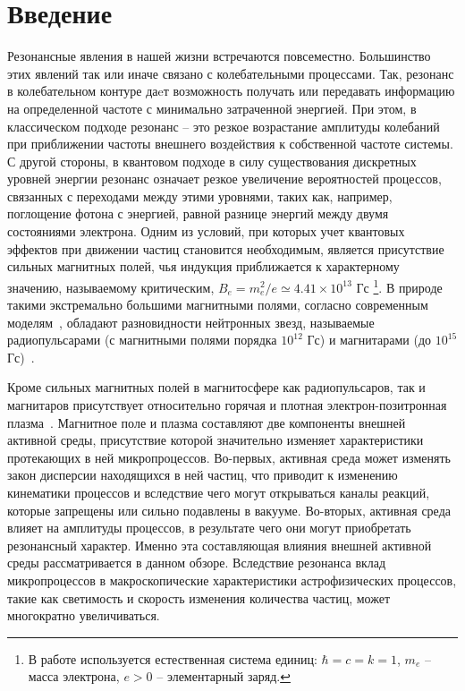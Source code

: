 \section{Введение}
Резонансные явления в нашей жизни встречаются повсеместно. Большинство этих явлений так или иначе связано с колебательными процессами. Так, резонанс в колебательном контуре даeт возможность получать или передавать информацию 
на определенной частоте с минимально затраченной энергией. При этом, в классическом подходе резонанс -- это резкое возрастание амплитуды колебаний при приближении частоты внешнего воздействия к собственной частоте системы. С другой стороны, в квантовом подходе в силу существования дискретных уровней энергии резонанс означает резкое увеличение вероятностей процессов, связанных с переходами между этими уровнями, таких как, например, поглощение фотона с энергией, равной разнице энергий между двумя состояниями электрона. Одним из условий, при которых учет квантовых эффектов при движении частиц становится необходимым, является присутствие сильных магнитных полей, чья индукция приближается к характерному значению, называемому критическим, $B_e = m_e^2 / e \simeq 4.41 \times 10^{13}$ Гс \footnote{В работе используется естественная система единиц: $\hbar = c = k = 1$, $m_e$ -- масса электрона, $e > 0$ --  элементарный заряд.}. В природе такими экстремально большими магнитными полями, согласно современным моделям~\cite{Duncan:1995,Thompson:1996,Thompson:2002}, обладают разновидности нейтронных звезд, называемые радиопульсарами (с магнитными полями порядка $10^{12}$ Гс) и магнитарами (до $10^{15}$ Гс)~\cite{McGill:Cite}.

Кроме сильных магнитных полей в магнитосфере как радиопульсаров, так и магнитаров присутствует относительно горячая и плотная электрон-позитронная плазма~\cite{Duncan:1995}. Магнитное поле и плазма составляют 
две компоненты внешней активной среды, присутствие которой значительно изменяет характеристики протекающих в ней микропроцессов. Во-первых, активная среда может изменять закон дисперсии 
находящихся в ней частиц, что приводит к изменению кинематики процессов и вследствие чего могут открываться  каналы реакций, которые запрещены или сильно подавлены в вакууме. Во-вторых, активная среда 
влияет на амплитуды процессов, в результате чего они могут приобретать резонансный характер. Именно эта составляющая влияния внешней активной среды рассматривается в данном обзоре. 
Вследствие резонанса вклад микропроцессов в макроскопические характеристики астрофизических процессов, такие как светимость и скорость изменения количества частиц, может 
многократно увеличиваться.

